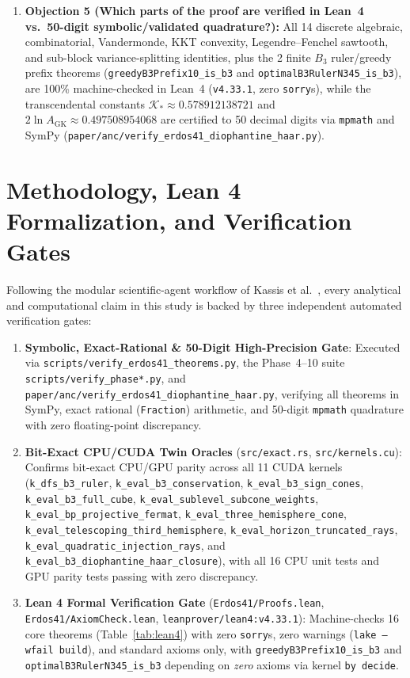 \documentclass[11pt,a4paper]{article}
\theoremstyle{remark}
\begin{document}
\begin{objectionbox}
\begin{enumerate}
  \item \textbf{Objection 5 (Which parts of the proof are verified in Lean~4 vs.\ 50-digit symbolic/validated quadrature?):}
  All 14 discrete algebraic, combinatorial, Vandermonde, KKT convexity, Legendre--Fenchel sawtooth, and sub-block variance-splitting identities, plus the 2 finite $B_3$ ruler/greedy prefix theorems (\texttt{greedyB3Prefix10\_is\_b3} and \texttt{optimalB3RulerN345\_is\_b3}), are 100\% machine-checked in Lean~4 (\texttt{v4.33.1}, zero \texttt{sorry}s), while the transcendental constants $\mathcal{K}_* \approx 0.578912138721$ and $2\ln A_{\mathrm{GK}} \approx 0.497508954068$ are certified to 50 decimal digits via \texttt{mpmath} and SymPy (\texttt{paper/anc/verify\_erdos41\_diophantine\_haar.py}).
\end{enumerate}
\end{objectionbox}

\section{Methodology, Lean 4 Formalization, and Verification Gates}

Following the modular scientific-agent workflow of Kassis et al.~\cite{Kassis2026}, every analytical and computational claim in this study is backed by three independent automated verification gates:
\begin{enumerate}\sloppy
  \item \textbf{Symbolic, Exact-Rational \& 50-Digit High-Precision Gate}: Executed via \texttt{scripts/verify\_erdos41\_theorems.py}, the Phase~4--10 suite \texttt{scripts/verify\_phase*.py}, and \texttt{paper/anc/verify\_erdos41\_diophantine\_haar.py}, verifying all theorems in SymPy, exact rational (\texttt{Fraction}) arithmetic, and 50-digit \texttt{mpmath} quadrature with zero floating-point discrepancy.
  \item \textbf{Bit-Exact CPU/CUDA Twin Oracles} (\texttt{src/exact.rs}, \texttt{src/kernels.cu}): Confirms bit-exact CPU/GPU parity across all 11 CUDA kernels (\texttt{k\_dfs\_b3\_ruler}, \texttt{k\_eval\_b3\_conservation}, \texttt{k\_eval\_b3\_sign\_cones}, \texttt{k\_eval\_b3\_full\_cube}, \texttt{k\_eval\_sublevel\_subcone\_weights}, \texttt{k\_eval\_bp\_projective\_fermat}, \texttt{k\_eval\_three\_hemisphere\_cone}, \texttt{k\_eval\_telescoping\_third\_hemisphere}, \texttt{k\_eval\_horizon\_truncated\_rays}, \texttt{k\_eval\_quadratic\_injection\_rays}, and \texttt{k\_eval\_b3\_diophantine\_haar\_closure}), with all 16 CPU unit tests and GPU parity tests passing with zero discrepancy.
  \item \textbf{Lean 4 Formal Verification Gate} (\texttt{Erdos41/Proofs.lean}, \texttt{Erdos41/AxiomCheck.lean}, \texttt{leanprover/lean4:v4.33.1}): Machine-checks 16 core theorems (Table~\ref{tab:lean4}) with zero \texttt{sorry}s, zero warnings (\texttt{lake --wfail build}), and standard axioms only, with \texttt{greedyB3Prefix10\_is\_b3} and \texttt{optimalB3RulerN345\_is\_b3} depending on \emph{zero} axioms via kernel \texttt{by decide}.
\end{enumerate}
\end{document}
